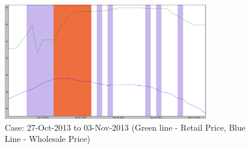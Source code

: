 \begin{itemize}
	\begin{figure}[H]
	\centering
	\includegraphics[width=0.8\textwidth]{graphs/Delhi_RetailvsWS_ill1.png}
	\caption{Case: 27-Oct-2013 to 03-Nov-2013 (Green line - Retail Price, Blue Line - Wholesale Price)}
	\label{fig:Delhi_RetailvsWS_ill1}
	\end{figure}


\end{itemize}
